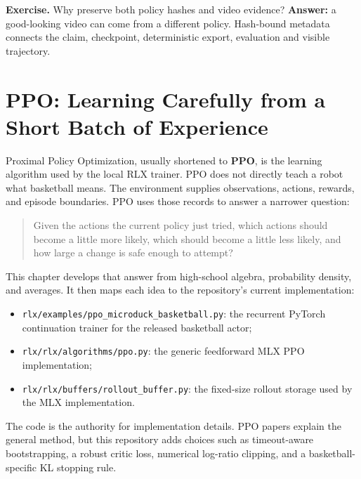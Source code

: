\documentclass[
  american,
  11pt,
  letterpaper,
]{article}
\providecommand{\tightlist}{%
  \setlength{\itemsep}{0pt}\setlength{\parskip}{0pt}}
\begin{document}
\textbf{Exercise.} Why preserve both policy hashes and video evidence?
\textbf{Answer:} a good-looking video can come from a different policy.
Hash-bound metadata connects the claim, checkpoint, deterministic
export, evaluation and visible trajectory.

\section{PPO: Learning Carefully from a Short Batch of
Experience}\label{ppo-learning-carefully-from-a-short-batch-of-experience}

Proximal Policy Optimization, usually shortened to \textbf{PPO}, is the
learning algorithm used by the local RLX trainer. PPO does not directly
teach a robot what basketball means. The environment supplies
observations, actions, rewards, and episode boundaries. PPO uses those
records to answer a narrower question:

\begin{quote}
Given the actions the current policy just tried, which actions should
become a little more likely, which should become a little less likely,
and how large a change is safe enough to attempt?
\end{quote}

This chapter develops that answer from high-school algebra, probability
density, and averages. It then maps each idea to the repository's
current implementation:

\begin{itemize}
\tightlist
\item
  \texttt{rlx/\allowbreak{}examples\allowbreak{}/\allowbreak{}ppo\_\allowbreak{}microduc\allowbreak{}k\_\allowbreak{}basketba\allowbreak{}ll.py}:
  the recurrent PyTorch continuation trainer for the released basketball
  actor;
\item
  \texttt{rlx/\allowbreak{}rlx/\allowbreak{}algorith\allowbreak{}ms/\allowbreak{}ppo.py}:
  the generic feedforward MLX PPO implementation;
\item
  \texttt{rlx/\allowbreak{}rlx/\allowbreak{}buffers/\allowbreak{}rollout\_\allowbreak{}buffer.p\allowbreak{}y}:
  the fixed-size rollout storage used by the MLX implementation.
\end{itemize}

The code is the authority for implementation details. PPO papers explain
the general method, but this repository adds choices such as
timeout-aware bootstrapping, a robust critic loss, numerical log-ratio
clipping, and a basketball-specific KL stopping rule.
\end{document}
